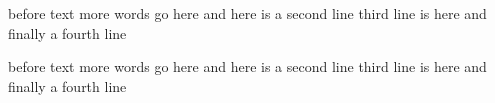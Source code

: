before text more words go here %
and here is a second line
third line is here%
and finally a fourth line

before text more words go here
and here is a second line
third line is here
and finally a fourth line
